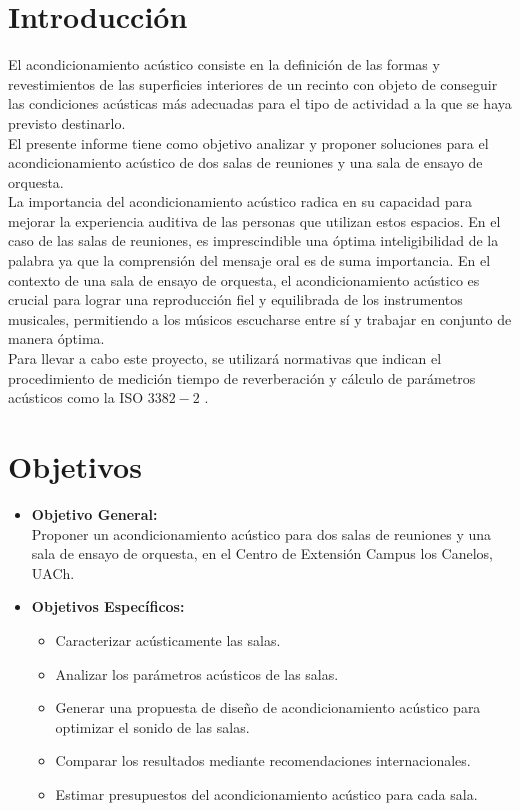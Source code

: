 \section{Introducción}
\noindent El acondicionamiento acústico consiste en la definición de las formas y revestimientos de las superficies interiores de un recinto con objeto de conseguir las condiciones acústicas más adecuadas para el tipo de actividad a la que se haya previsto destinarlo.\cite{carrion1990diseno} \\
El presente informe tiene como objetivo analizar y proponer soluciones para el acondicionamiento acústico de dos salas de reuniones y una sala de ensayo de orquesta. \\

\noindent
La importancia del acondicionamiento acústico radica en su capacidad para mejorar la experiencia auditiva de las personas que utilizan estos espacios.
En el caso de las salas de reuniones, es imprescindible una óptima inteligibilidad de la palabra ya que la comprensión del mensaje oral es de suma importancia. \cite{carrion1990diseno}
En el contexto de una sala de ensayo de orquesta, el acondicionamiento acústico es crucial para lograr una reproducción fiel y equilibrada de los instrumentos musicales, permitiendo a los músicos escucharse entre sí y trabajar en conjunto de manera óptima. \\
\noindent
Para llevar a cabo este proyecto, se utilizará normativas que indican el procedimiento de medición tiempo de reverberación y cálculo de parámetros acústicos como la ISO $3382-2$ \cite{ISO3382-2}.

\section{Objetivos}
\begin{itemize}
    \item \textbf{Objetivo General:} \\
    Proponer un acondicionamiento acústico para dos salas de reuniones y una sala de ensayo de orquesta, en el Centro de Extensión Campus los Canelos, UACh.

    \item \textbf{Objetivos Específicos:}
    \begin{itemize}
        \item Caracterizar acústicamente las salas.
        \item Analizar los parámetros acústicos de las salas.
        \item Generar una propuesta de diseño de acondicionamiento acústico para optimizar el sonido de las salas.
        \item Comparar los resultados mediante recomendaciones internacionales. 
        \item Estimar presupuestos del acondicionamiento acústico para cada sala.

    \end{itemize}
\end{itemize}